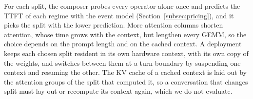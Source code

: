 For each split, the composer probes every operator alone once and predicts the TTFT of each regime with the event model (Section~\ref{subsec:pricing}), and it picks the split with the lower prediction.
More attention columns shorten attention, whose time grows with the context, but lengthen every GEMM, so the choice depends on the prompt length and on the cached context.
A deployment keeps each chosen split resident in its own hardware context, with its own copy of the weights, and switches between them at a turn boundary by suspending one context and resuming the other.
The KV cache of a cached context is laid out by the attention groups of the split that computed it, so a conversation that changes split must lay out or recompute its context again, which we do not evaluate.
